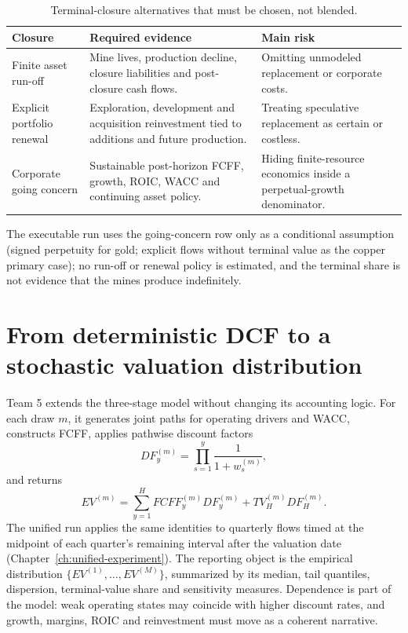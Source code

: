\begin{table}[H]
\centering
\caption{Terminal-closure alternatives that must be chosen, not blended.}
\label{tab:terminal-closure-alternatives}
\small
\renewcommand{\arraystretch}{1.12}
\begin{tabularx}{\textwidth}{@{}p{3.00cm}X X@{}}
\toprule
Closure & Required evidence & Main risk \\
\midrule
Finite asset run-off & Mine lives, production decline, closure liabilities and
post-closure cash flows. & Omitting unmodeled replacement or corporate costs. \\
Explicit portfolio renewal & Exploration, development and acquisition
reinvestment tied to additions and future production. & Treating speculative
replacement as certain or costless. \\
Corporate going concern & Sustainable post-horizon FCFF, growth, ROIC, WACC
and continuing asset policy. & Hiding finite-resource economics inside a
perpetual-growth denominator. \\
\bottomrule
\end{tabularx}
\end{table}

The executable run uses the going-concern row only as a conditional assumption
(signed perpetuity for gold; explicit flows without terminal value as the copper
primary case); no run-off or renewal policy is estimated, and the terminal
share is not evidence that the mines produce indefinitely.

\section{From deterministic DCF to a stochastic valuation distribution}

Team 5 extends the three-stage model without changing its accounting logic.
For each draw \(m\), it generates joint paths for operating drivers and WACC,
constructs FCFF, applies pathwise discount factors
\begin{equation}
DF_y^{(m)}=\prod_{s=1}^{y}\frac{1}{1+w_s^{(m)}},
\end{equation}
and returns
\begin{equation}
EV^{(m)}=\sum_{y=1}^{H}FCFF_y^{(m)}DF_y^{(m)}
       +TV_H^{(m)}DF_H^{(m)}.
\end{equation}
The unified run applies the same identities to quarterly flows timed at the
midpoint of each quarter's remaining interval after the valuation date
(Chapter~\ref{ch:unified-experiment}). The reporting object is the empirical distribution
\(\{EV^{(1)},\ldots,EV^{(M)}\}\), summarized by its median, tail quantiles,
dispersion, terminal-value share and sensitivity measures. Dependence is part
of the model: weak operating states may coincide with higher discount rates,
and growth, margins, ROIC and reinvestment must move as a coherent narrative.

